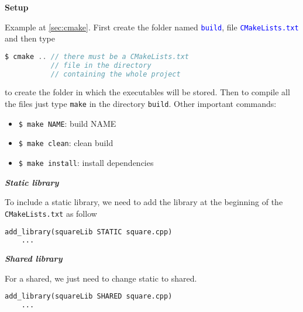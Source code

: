 \documentclass[fontsize=8pt, a4paper, landscape, fleqn]{scrartcl}
\renewcommand{\subsection}[1]{%
    \noindent\colorbox{subsectioncolor}{%
        \parbox{\dimexpr\columnwidth-2\fboxsep}{\color{white}\textbf{#1}}}%
    \vspace{0.5mm}%
}
\renewcommand{\subsubsection}[1]{%
    \noindent\textbf{\textit{\color{subsectioncolor}#1}}%
    \vspace{1mm}%
}
\begin{document}
\begin{multicols*}{3}[\raggedcolumns]
	\subsection{Setup}
    Example at \colorbox{red!7}{\autoref{sec:cmake}}. First create the folder named \textcolor{blue}{\lstinline{build}}, file \textcolor{blue}{\lstinline{CMakeLists.txt}} and then type

    \begin{lstlisting}[language=C, breaklines]   
$ cmake .. // there must be a CMakeLists.txt 
           // file in the directory
           // containing the whole project \end{lstlisting}

    to create the folder in which the executables will be stored. Then to compile all the files just type \lstinline{make} in the directory \lstinline{build}. Other important commands:
    
    \begin{multicols}{2}
    \begin{itemize}
        \item \lstinline{$ make NAME}: build NAME
        \item \lstinline{$ make clean}: clean build
        \item \lstinline{$ make install}: install dependencies
    \end{itemize}
    \end{multicols}

    \subsubsection{Static library} 
    To include a static library, we need to add the library at the beginning of the \lstinline{CMakeLists.txt} as follow

    \begin{lstlisting}[language=make, breaklines, emph={STATIC}, emphstyle={\color{red}}]
    add_library(squareLib STATIC square.cpp)
    ...\end{lstlisting}

    \subsubsection{Shared library}
    For a shared, we just need to change static to shared.
    
    \begin{lstlisting}[language=make, breaklines, emph={SHARED}, emphstyle={\color{red}}]
    add_library(squareLib SHARED square.cpp)
    ...\end{lstlisting}

\end{multicols*}
\end{document}
